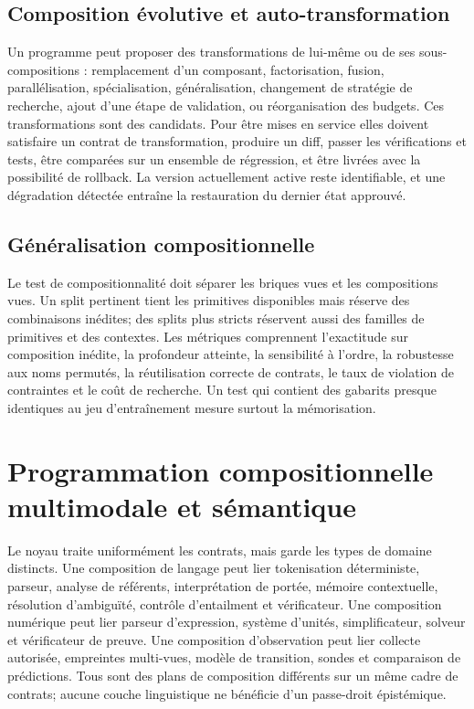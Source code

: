 \documentclass[11pt,a4paper]{article}
\theoremstyle{definition}
\theoremstyle{plain}
\theoremstyle{remark}
\begin{document}
\subsection{Composition évolutive et auto-transformation}
Un programme peut proposer des transformations de lui-même ou de ses sous-compositions : remplacement d'un composant, factorisation, fusion, parallélisation, spécialisation, généralisation, changement de stratégie de recherche, ajout d'une étape de validation, ou réorganisation des budgets. Ces transformations sont des candidats. Pour être mises en service elles doivent satisfaire un contrat de transformation, produire un diff, passer les vérifications et tests, être comparées sur un ensemble de régression, et être livrées avec la possibilité de rollback. La version actuellement active reste identifiable, et une dégradation détectée entraîne la restauration du dernier état approuvé.

\subsection{Généralisation compositionnelle}
Le test de compositionnalité doit séparer les briques vues et les compositions vues. Un split pertinent tient les primitives disponibles mais réserve des combinaisons inédites; des splits plus stricts réservent aussi des familles de primitives et des contextes. Les métriques comprennent l'exactitude sur composition inédite, la profondeur atteinte, la sensibilité à l'ordre, la robustesse aux noms permutés, la réutilisation correcte de contrats, le taux de violation de contraintes et le coût de recherche. Un test qui contient des gabarits presque identiques au jeu d'entraînement mesure surtout la mémorisation.

\section{Programmation compositionnelle multimodale et sémantique}
Le noyau traite uniformément les contrats, mais garde les types de domaine distincts. Une composition de langage peut lier tokenisation déterministe, parseur, analyse de référents, interprétation de portée, mémoire contextuelle, résolution d'ambiguïté, contrôle d'entailment et vérificateur. Une composition numérique peut lier parseur d'expression, système d'unités, simplificateur, solveur et vérificateur de preuve. Une composition d'observation peut lier collecte autorisée, empreintes multi-vues, modèle de transition, sondes et comparaison de prédictions. Tous sont des plans de composition différents sur un même cadre de contrats; aucune couche linguistique ne bénéficie d'un passe-droit épistémique.
\end{document}
